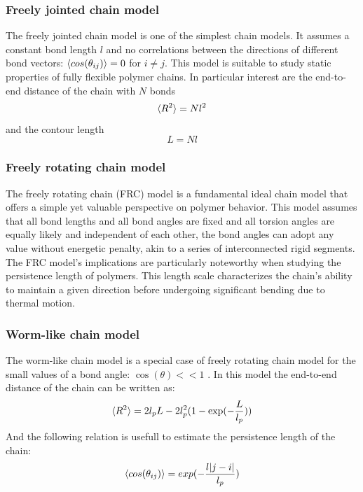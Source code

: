 \documentclass[
    paper=A4,pagesize=automedia,fontsize=12pt,
    BCOR=15mm,DIV=22,
    twoside,headinclude,footinclude=false,
    ngerman,fleqn,             %
    bibliography=totocnumbered,          %
    listof=totoc,                %
    listof=flat,                 %
    cleardoublepage=empty      %
    numbers=endperiod
]{scrartcl}
\begin{document}
\subsubsection{Freely jointed chain model}
The freely jointed chain model is one of the simplest chain models. It assumes
a constant bond length $l$ and no correlations between the directions of different
bond vectors: $\langle cos(\theta_{ij})\rangle = 0$ for $i \neq j$. This model is suitable
to study static properties of fully flexible polymer chains. In particular interest
are the end-to-end distance of the chain with $N$ bonds
\begin{equation}
    \langle R^2\rangle = N l^2
\end{equation}
and the contour length 
\begin{equation}
    L = N l
\end{equation}

\subsubsection{Freely rotating chain model}

The freely rotating chain (FRC) model is a fundamental ideal chain model 
that offers a simple yet valuable perspective on polymer behavior. 
This model assumes that all bond lengths and all bond angles are fixed and
all torsion angles are equally likely and independent of each other, the bond angles can adopt any value without energetic 
penalty, akin to a series of interconnected rigid segments.
\\
The FRC model's implications are particularly noteworthy when 
studying the persistence length of polymers. 
This length scale characterizes the chain's ability to maintain a 
given direction before undergoing significant bending due to thermal motion. 


\subsubsection{Worm-like chain model}
The worm-like chain model is a special case of freely rotating chain model for
the small values of a bond angle: $\cos(\theta) << 1$ \cite{Rub_Colby_PolyPhy:2005}.
In this model the end-to-end distance of the chain can be written as:
\begin{equation}
    \langle R^2\rangle = 2 l_p L - 2 l_p^2 (1-\exp(-\frac{L}{l_p}))
\end{equation}
And the following relation is usefull to estimate the persistence length of the chain:
\begin{equation}
    \langle cos(\theta_{ij})\rangle = exp(-\frac{l |j-i|}{l_p})
\end{equation}
\end{document}
